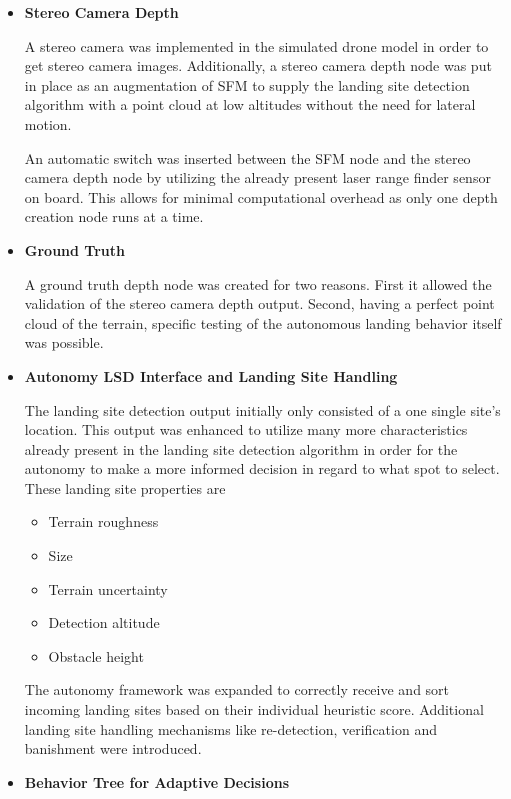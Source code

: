 \begin{itemize}
    \item \textbf{Stereo Camera Depth}

    A stereo camera was implemented in the simulated drone model in order to get stereo camera images. Additionally, a stereo camera depth node was put in place as an augmentation of SFM to supply the landing site detection algorithm with a point cloud at low altitudes without the need for lateral motion. 

    An automatic switch was inserted between the SFM node and the stereo camera depth node by utilizing the already present laser range finder sensor on board. This allows for minimal computational overhead as only one depth creation node runs at a time.

    \item \textbf{Ground Truth}

    A ground truth depth node was created for two reasons. First it allowed the validation of the stereo camera depth output. Second, having a perfect point cloud of the terrain, specific testing of the autonomous landing behavior itself was possible.

    \item \textbf{Autonomy LSD Interface and Landing Site Handling}

    The landing site detection output initially only consisted of a one single site's location. This output was enhanced to utilize many more characteristics already present in the landing site detection algorithm in order for the autonomy to make a more informed decision in regard to what spot to select. These landing site properties are
    
    \begin{itemize}
        \item Terrain roughness
        \item Size
        \item Terrain uncertainty
        \item Detection altitude
        \item Obstacle height
    \end{itemize}

    The autonomy framework was expanded to correctly receive and sort incoming landing sites based on their individual heuristic score. Additional landing site handling mechanisms like re-detection, verification and banishment were introduced.
    \item \textbf{Behavior Tree for Adaptive Decisions}


\end{itemize}
